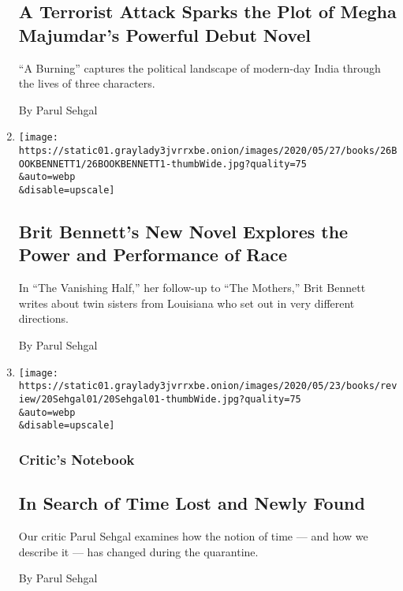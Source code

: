 \begin{enumerate}
{  \subsection{A Terrorist Attack Sparks the Plot of Megha Majumdar's
  Powerful Debut
  Novel}\label{a-terrorist-attack-sparks-the-plot-of-megha-majumdars-powerful-debut-novel}}

  ``A Burning'' captures the political landscape of modern-day India
  through the lives of three characters.

  By Parul Sehgal
\item
  \href{/2020/05/26/books/review-vanishing-half-brit-bennett.html}{}

  \texttt{[image: https://static01.graylady3jvrrxbe.onion/images/2020/05/27/books/26BOOKBENNETT1/26BOOKBENNETT1-thumbWide.jpg?quality=75\\\&auto=webp\\\&disable=upscale]}

  \hypertarget{brit-bennetts-new-novel-explores-the-power-and-performance-of-race}{%
  \subsection{Brit Bennett's New Novel Explores the Power and
  Performance of
  Race}\label{brit-bennetts-new-novel-explores-the-power-and-performance-of-race}}

  In ``The Vanishing Half,'' her follow-up to ``The Mothers,'' Brit
  Bennett writes about twin sisters from Louisiana who set out in very
  different directions.

  By Parul Sehgal
\item
  \href{/2020/05/19/books/review/coronavirus-literature-time.html}{}

  \texttt{[image: https://static01.graylady3jvrrxbe.onion/images/2020/05/23/books/review/20Sehgal01/20Sehgal01-thumbWide.jpg?quality=75\\\&auto=webp\\\&disable=upscale]}

  \hypertarget{critics-notebook}{%
  \subsubsection{Critic's Notebook}\label{critics-notebook}}

  \hypertarget{in-search-of-time-lost-and-newly-found}{%
  \subsection{In Search of Time Lost and Newly
  Found}\label{in-search-of-time-lost-and-newly-found}}

  Our critic Parul Sehgal examines how the notion of time --- and how we
  describe it --- has changed during the quarantine.

  By Parul Sehgal
\end{enumerate}

